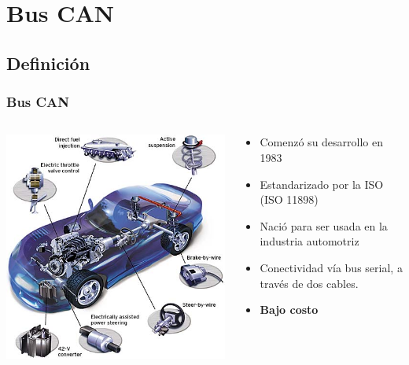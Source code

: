 \section{Bus CAN}
\subsection{Definición}
\begin{frame}
	\frametitle{Bus CAN}
    \begin{columns}[T]
    	\begin{column}{.5\textwidth}
    		\includegraphics[scale=0.4]{images/ProtocoloCANAuto.png}
    	\end{column}
    	\begin{column}{.5\textwidth}
			\begin{itemize}
				\item Comenzó su desarrollo en 1983
				\item Estandarizado por la ISO (ISO 11898)
				\item Nació para ser usada en la industria automotriz
				\item Conectividad vía bus serial, a través de dos cables. 
				\item \textbf{Bajo costo}
			\end{itemize}
    	\end{column}
	\end{columns}
\end{frame}

